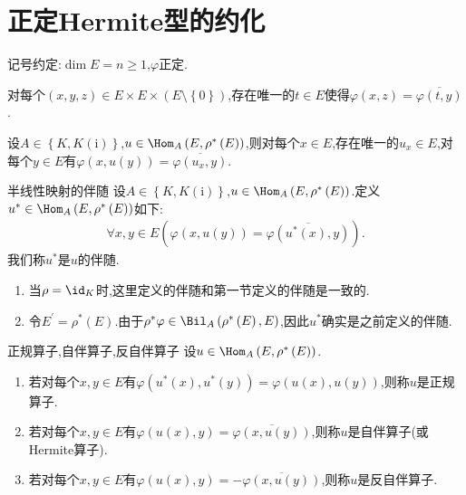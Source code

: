 \section{正定Hermite型的约化}

记号约定:$\dim E=n\geq 1$,$\varphi$正定.

\begin{lemma}{}{}
	对每个$\left(x,y,z\right)\in E\times E\times\left(E\setminus\left\{0\right\}\right)$,存在唯一的$t\in E$使得$\varphi\left(x,z\right)=\overline{\varphi\left(t,y\right)}$.
\end{lemma}

\begin{lemma}{}{}
	设$A\in\left\{K,K(\mathrm{i})\right\}$,$u\in\Hom_{A}\left(E,\rho^{\ast}\left(E\right)\right)$,则对每个$x\in E$,存在唯一的$u_{x}\in E$,对每个$y\in E$有$\varphi\left(x,u\left(y\right)\right)=\overline{\varphi\left(u_{x},y\right)}$.
\end{lemma}

\begin{definition}{半线性映射的伴随}{}
	设$A\in\left\{K,K(\mathrm{i})\right\}$,$u\in\Hom_{A}\left(E,\rho^{\ast}\left(E\right)\right)$.定义$u^{\ast}\in\Hom_{A}\left(E,\rho^{\ast}\left(E\right)\right)$如下:
	\begin{align*}
		\forall x,y\in E\left(\varphi\left(x,u\left(y\right)\right)=\overline{\varphi\left(u^{\ast}\left(x\right),y\right)}\right).
	\end{align*}
	我们称$u^{\ast}$是$u$的伴随.
\end{definition}

\begin{remark}{}{}
	\begin{enumerate}
		\item 当$\rho=\id_{K}$时,这里定义的伴随和第一节定义的伴随是一致的.
		\item 令$E^{\prime}=\rho^{\ast}\left(E\right)$.由于$\rho^{\ast}\varphi\in\Bil_{A}\left(\rho^{\ast}\left(E\right),E\right)$,因此$u^{\ast}$确实是之前定义的伴随.
	\end{enumerate}
\end{remark}

\begin{definition}{正规算子,自伴算子,反自伴算子}{}
	设$u\in\Hom_{A}\left(E,\rho^{\ast}\left(E\right)\right)$.
	\begin{enumerate}
		\item 若对每个$x,y\in E$有$\varphi\left(u^{\ast}\left(x\right),u^{\ast}\left(y\right)\right)=\varphi\left(u\left(x\right),u\left(y\right)\right)$,则称$u$是正规算子.
		\item 若对每个$x,y\in E$有$\varphi\left(u\left(x\right),y\right)=\overline{\varphi\left(x,u\left(y\right)\right)}$,则称$u$是自伴算子(或Hermite算子).
		\item 若对每个$x,y\in E$有$\varphi\left(u\left(x\right),y\right)=-\overline{\varphi\left(x,u\left(y\right)\right)}$,则称$u$是反自伴算子.
	\end{enumerate}
\end{definition}

